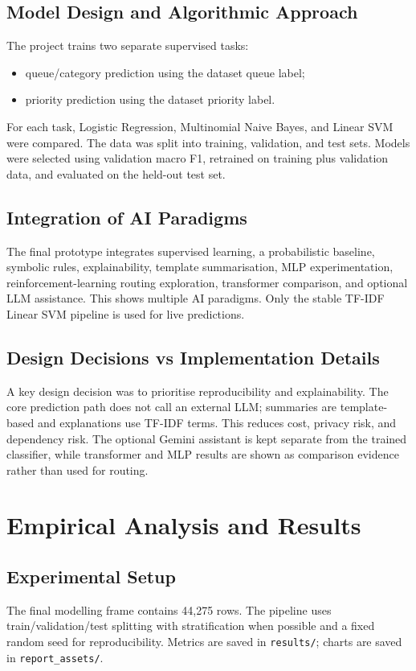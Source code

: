 \documentclass[11pt,a4paper]{article}
\begin{document}
\subsection{Model Design and Algorithmic Approach}
The project trains two separate supervised tasks:
\begin{itemize}
  \item queue/category prediction using the dataset queue label;
  \item priority prediction using the dataset priority label.
\end{itemize}
For each task, Logistic Regression, Multinomial Naive Bayes, and Linear SVM were compared. The data was split into training, validation, and test sets. Models were selected using validation macro F1, retrained on training plus validation data, and evaluated on the held-out test set.

\subsection{Integration of AI Paradigms}
The final prototype integrates supervised learning, a probabilistic baseline, symbolic rules, explainability, template summarisation, MLP experimentation, reinforcement-learning routing exploration, transformer comparison, and optional LLM assistance. This shows multiple AI paradigms. Only the stable TF-IDF Linear SVM pipeline is used for live predictions.

\subsection{Design Decisions vs Implementation Details}
A key design decision was to prioritise reproducibility and explainability. The core prediction path does not call an external LLM; summaries are template-based and explanations use TF-IDF terms. This reduces cost, privacy risk, and dependency risk. The optional Gemini assistant is kept separate from the trained classifier, while transformer and MLP results are shown as comparison evidence rather than used for routing.

\section{Empirical Analysis and Results}
\subsection{Experimental Setup}
The final modelling frame contains 44,275 rows. The pipeline uses train/validation/test splitting with stratification when possible and a fixed random seed for reproducibility. Metrics are saved in \texttt{results/}; charts are saved in \texttt{report\_assets/}.
\end{document}
